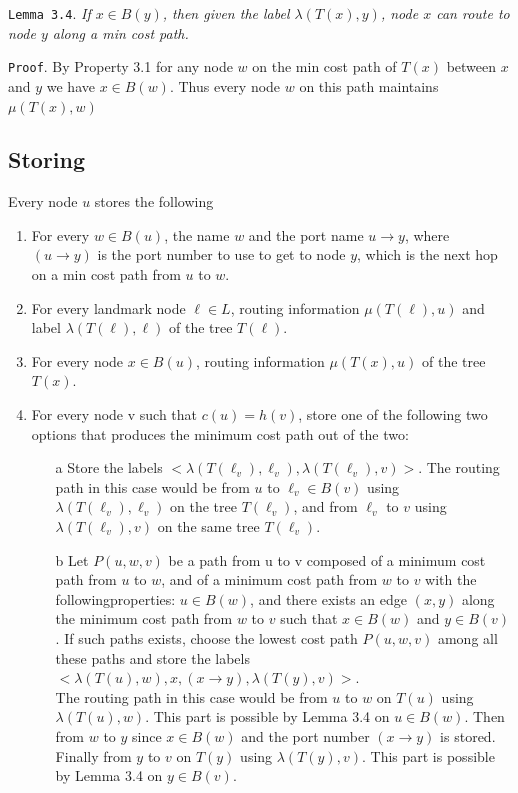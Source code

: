 
\texttt{Lemma 3.4}. \textit{If $x\in B(y)$, then given the label $\lambda(T(x),y)$, node $x$ can route to node $y$ along a min cost path.}

\texttt{Proof}. By Property 3.1 for any node $w$ on the min cost path of $T(x)$ between $x$ and $y$ we have $x\in B(w)$. Thus every node $w$ on this path maintains $\mu(T(x),w)$

\subsection{Storing}\label{subsec:storing}
Every node $u$ stores the following
\begin{enumerate}
    \item For every $w\in B(u)$, the name $w$ and the port name $u\rightarrow y$, where $(u\rightarrow y)$ is the port number to use to get to node $y$, which is the next hop on a min cost path from $u$ to $w$.
    \item For every landmark node $\ell \in L$, routing information $\mu(T(\ell),u)$ and label $\lambda(T(\ell),\ell)$ of the tree $T(\ell)$.
    \item For every node $x\in B(u)$, routing information $\mu(T(x),u)$ of the tree $T(x)$.
    \item For every node v such that $c(u) = h(v)$, store one of the following two options that produces the minimum cost path out of the two:
    \begin{enumerate}
        \item[a] Store the labels $<\lambda(T (\ell_v), \ell_v ), \lambda(T (\ell_v), v)>$. The routing path in this case would be from $u$ to $\ell_v \in B(v)$ using $\lambda(T (\ell_v), \ell_v)$ on the tree $T (\ell_v)$, and from $\ell_v$ to $v$ using $\lambda(T (\ell_v), v)$ on the same tree $T (\ell_v)$.

        \item[b] Let $P(u, w, v)$ be a path from u to v composed of a minimum cost path from $u$ to $w$, and of a minimum cost path from $w$ to $v$ with the followingproperties: $u \in B(w)$, and there exists an edge $(x, y)$ along the minimum cost path from $w$ to $v$ such that $x \in B(w)$ and $y \in B(v)$. If such paths exists, choose the lowest cost path $P(u, w, v)$ among all these paths and store the labels $<\lambda(T (u), w), x, (x \rightarrow y), \lambda(T (y), v)>$.\\
        The routing path in this case would be from $u$ to $w$ on $T(u)$ using $\lambda(T (u), w)$. This part is possible by Lemma 3.4 on $u \in B(w)$. Then from $w$ to $y$ since $x \in B(w)$ and the port number $(x \rightarrow y)$ is stored. Finally from $y$ to $v$ on $T(y)$ using $\lambda(T (y), v)$. This part is possible by Lemma 3.4 on $y \in B(v)$.
    \end{enumerate}
\end{enumerate}

